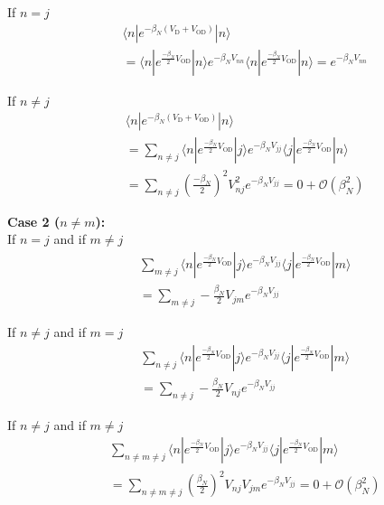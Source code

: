 \documentclass[phd,tocprelim]{cornell}
\begin{document}
\noindent If $n=j$ 
\begin{eqnarray}
&&\langle n |
e^{-\beta_N (V_{\textrm{D}} + V_{\textrm{OD}})} |
n\rangle\\
\nonumber
&&=\langle n|
e^{\frac{-\beta_N}{2} V_{\textrm{OD}}}|n\rangle
e^{-\beta_N V_{nn}} \langle n|
e^{\frac{-\beta_N}{2} V_{\textrm{OD}}}
|n\rangle=e^{-\beta_N V_{nn}}
\end{eqnarray}

\noindent
If $n \neq j$ 
\begin{eqnarray}
&&\langle n |
e^{-\beta_N (V_{\textrm{D}} + V_{\textrm{OD}})} |
n\rangle \\ 
\nonumber
&&=
\sum_{n \neq j}\langle n |
e^{\frac{-\beta_N}{2} V_{\textrm{OD}}}|j\rangle
e^{-\beta_N V_{j j}} \langle j|
e^{\frac{-\beta_N}{2} V_{\textrm{OD}}}
|n\rangle\\ 
\nonumber
&&=
\sum_{n \neq j} \left(\frac{-\beta_N}{2}\right)^2 V_{n j}^2
e^{-\beta_N V_{j
j}} = 0 + \mathcal{O}(\beta_N^2)
\end{eqnarray}

\noindent
{\bf Case 2 ($n\neq m$):}\\

\noindent
If $n = j$ and if $m \neq j$
\begin{eqnarray} \label{eq:mnej}
&&\sum_{m \neq j}\langle n |
e^{\frac{-\beta_N}{2} V_{\textrm{OD}}}|j\rangle
e^{-\beta_N V_{j j}} \langle j|
e^{\frac{-\beta_N}{2} V_{\textrm{OD}}}
|m\rangle
\nonumber
\\ && =
\sum_{m \neq j}-\frac{\beta_N}{2} 
V_{ jm} e^{-\beta_N V_{j j}}
\end{eqnarray}

\noindent
If $n \neq j$ and if $m = j$
\begin{eqnarray}  \label{eq:nnej}
&& \sum_{n \neq j}\langle n |
e^{\frac{-\beta_N}{2} V_{\textrm{OD}}}|j\rangle
e^{-\beta_N V_{j j}} \langle j|
e^{\frac{-\beta_N}{2} V_{\textrm{OD}}}
|m\rangle 
\nonumber
\\
&&=
\sum_{n \neq j} -\frac{\beta_N}{2}
V_{n j}e^{-\beta_N V_{j j}}
\end{eqnarray}

\noindent
If $n \neq j$ and if
$m \neq j$ \begin{eqnarray} 
\label{eq:nneqj} 
&&\sum_{n \neq m \neq j }\langle n |
e^{\frac{-\beta_N}{2} V_{\textrm{OD}}}|j\rangle
e^{-\beta_N V_{j j}} \langle j|
e^{\frac{-\beta_N}{2} V_{\textrm{OD}}}
|m\rangle
\\ 
\nonumber
&&=\sum_{n \neq m \neq j }
\left(\frac{\beta_N}{2}\right)^2 
V_{n j}V_{jm} e^{-\beta_N V_{j
j}}= 0 + \mathcal{O}(\beta_N^2)
\end{eqnarray}
\end{document}
